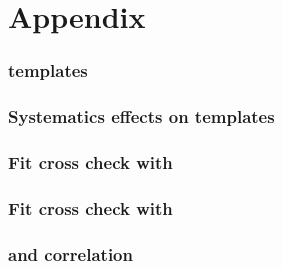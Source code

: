 \documentclass[UKenglish,texlive=2013]{\ATLASLATEXPATH atlasdoc}
\begin{document}




\clearpage
\appendix
\part*{Appendix}

\clearpage
\section{\subsdzero templates}
\label{sec:app-sd0templates}


\clearpage
\section{Systematics effects on templates}
\label{sec:app-sysvariations}


\clearpage
\section{Fit cross check with \sdzero}
\label{sec:app-sd0}


\clearpage
\section{Fit cross check with \subsubsdzero}
\label{sec:app-subsubsd0}


\clearpage
\section{\subsdzero and \subsubsdzero correlation}
\label{sec:app-sd0corr}

\end{document}
